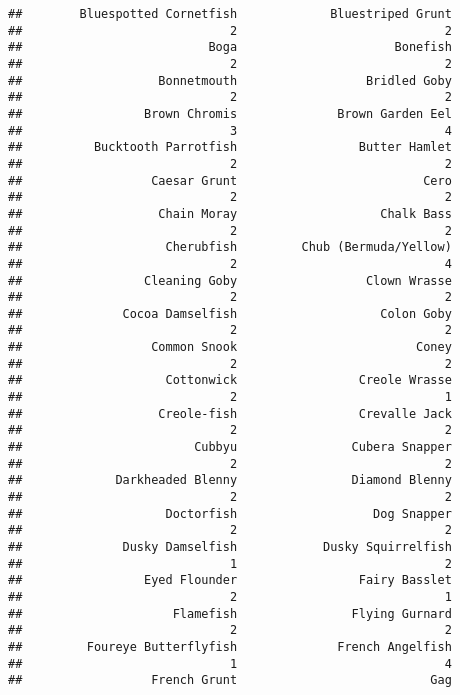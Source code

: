 \documentclass[
]{article}
\begin{document}
\begin{verbatim}
##        Bluespotted Cornetfish             Bluestriped Grunt 
##                             2                             2 
##                          Boga                      Bonefish 
##                             2                             2 
##                   Bonnetmouth                  Bridled Goby 
##                             2                             2 
##                 Brown Chromis              Brown Garden Eel 
##                             3                             4 
##          Bucktooth Parrotfish                 Butter Hamlet 
##                             2                             2 
##                  Caesar Grunt                          Cero 
##                             2                             2 
##                   Chain Moray                    Chalk Bass 
##                             2                             2 
##                    Cherubfish         Chub (Bermuda/Yellow) 
##                             2                             4 
##                 Cleaning Goby                  Clown Wrasse 
##                             2                             2 
##              Cocoa Damselfish                    Colon Goby 
##                             2                             2 
##                  Common Snook                         Coney 
##                             2                             2 
##                    Cottonwick                 Creole Wrasse 
##                             2                             1 
##                   Creole-fish                 Crevalle Jack 
##                             2                             2 
##                        Cubbyu                Cubera Snapper 
##                             2                             2 
##             Darkheaded Blenny                Diamond Blenny 
##                             2                             2 
##                    Doctorfish                   Dog Snapper 
##                             2                             2 
##              Dusky Damselfish            Dusky Squirrelfish 
##                             1                             2 
##                 Eyed Flounder                 Fairy Basslet 
##                             2                             1 
##                     Flamefish                Flying Gurnard 
##                             2                             2 
##         Foureye Butterflyfish              French Angelfish 
##                             1                             4 
##                  French Grunt                           Gag 

\end{verbatim}
\end{document}
